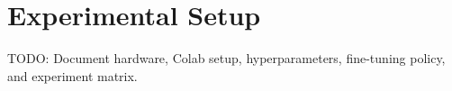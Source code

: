 \section{Experimental Setup}

TODO: Document hardware, Colab setup, hyperparameters, fine-tuning policy, and experiment matrix.
